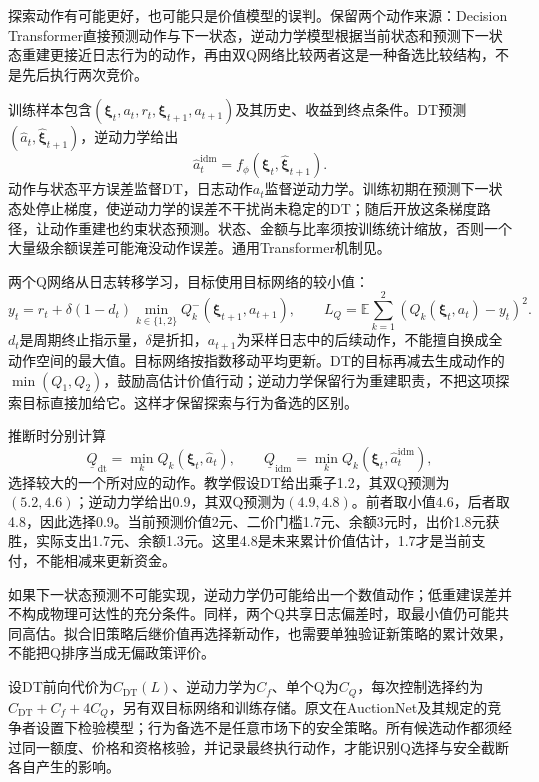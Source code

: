 探索动作有可能更好，也可能只是价值模型的误判。保留两个动作来源：Decision Transformer直接预测动作与下一状态，逆动力学模型根据当前状态和预测下一状态重建更接近日志行为的动作，再由双Q网络比较两者这是一种备选比较结构，不是先后执行两次竞价。

训练样本包含$(\bm{\xi}_t,a_t,r_t,\bm{\xi}_{t+1},a_{t+1})$及其历史、收益到终点条件。DT预测$(\widehat a_t,\widehat{\bm{\xi}}_{t+1})$，逆动力学给出
\[
  \widehat a_t^{\mathrm{idm}}
      =f_\phi(\bm{\xi}_t,\widehat{\bm{\xi}}_{t+1}).
\]
动作与状态平方误差监督DT，日志动作$a_t$监督逆动力学。训练初期在预测下一状态处停止梯度，使逆动力学的误差不干扰尚未稳定的DT；随后开放这条梯度路径，让动作重建也约束状态预测。状态、金额与比率须按训练统计缩放，否则一个大量级余额误差可能淹没动作误差。通用Transformer机制见。

两个Q网络从日志转移学习，目标使用目标网络的较小值：
\begin{equation}
  y_t=r_t+\delta(1-d_t)
       \min_{k\in\{1,2\}}
          Q_k^{-}(\bm{\xi}_{t+1},a_{t+1}),\qquad
  L_Q=\mathbb{E}\sum_{k=1}^{2}
          (Q_k(\bm{\xi}_t,a_t)-y_t)^2.
  \label{eq:rs-advertising-guide-q}
\end{equation}
$d_t$是周期终止指示量，$\delta$是折扣，$a_{t+1}$为采样日志中的后续动作，不能擅自换成全动作空间的最大值。目标网络按指数移动平均更新。DT的目标再减去生成动作的$\min(Q_1,Q_2)$，鼓励高估计价值行动；逆动力学保留行为重建职责，不把这项探索目标直接加给它。这样才保留探索与行为备选的区别。

推断时分别计算
\[
  \underline Q_{\mathrm{dt}}=\min_k Q_k(\bm{\xi}_t,\widehat a_t),
  \qquad
  \underline Q_{\mathrm{idm}}=\min_k Q_k(\bm{\xi}_t,\widehat a_t^{\mathrm{idm}}),
\]
选择较大的一个所对应的动作。教学假设DT给出乘子1.2，其双Q预测为$(5.2,4.6)$；逆动力学给出0.9，其双Q预测为$(4.9,4.8)$。前者取小值4.6，后者取4.8，因此选择0.9。当前预测价值2元、二价门槛1.7元、余额3元时，出价1.8元获胜，实际支出1.7元、余额1.3元。这里4.8是未来累计价值估计，1.7才是当前支付，不能相减来更新资金。

如果下一状态预测不可能实现，逆动力学仍可能给出一个数值动作；低重建误差并不构成物理可达性的充分条件。同样，两个Q共享日志偏差时，取最小值仍可能共同高估。拟合旧策略后继价值再选择新动作，也需要单独验证新策略的累计效果，不能把Q排序当成无偏政策评价。

设DT前向代价为$C_{\mathrm{DT}}(L)$、逆动力学为$C_f$、单个Q为$C_Q$，每次控制选择约为$C_{\mathrm{DT}}+C_f+4C_Q$，另有双目标网络和训练存储。原文在AuctionNet及其规定的竞争者设置下检验模型；行为备选不是任意市场下的安全策略。所有候选动作都须经过同一额度、价格和资格核验，并记录最终执行动作，才能识别Q选择与安全截断各自产生的影响。

